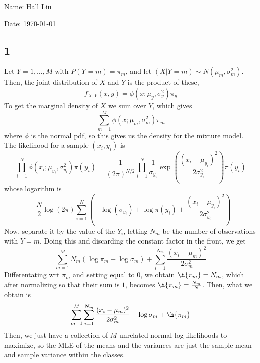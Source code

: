 \documentclass{article}
\begin{document}
Name: Hall Liu

Date: \today 
\vspace{1.5cm}
\subsection*{1}
Let $Y=1,\ldots,M$ with $P(Y=m)=\pi_m$, and let $(X|Y=m)\sim N(\mu_m, \sigma_m^2)$. Then, the joint distribution of $X$ and $Y$ is the product of these,
\[f_{X,Y}(x,y)=\phi(x;\mu_y,\sigma_y^2)\pi_y\]
To get the marginal density of $X$ we sum over $Y$, which gives
\[\sum_{m=1}^M\phi(x;\mu_m,\sigma_m^2)\pi_m\]
where $\phi$ is the normal pdf, so this gives us the density for the mixture model.
The likelihood for a sample $(x_i,y_i)$ is 
\[\prod_{i=1}^N\phi(x_i;\mu_{y_i}, \sigma_{y_i}^2)\pi(y_i)=\frac{1}{(2\pi)^{N/2}}\prod_{i=1}^N\frac{1}{\sigma_{y_i}}\exp\left(\frac{(x_i-\mu_{y_i})^2}{2\sigma_{y_i}^2}\right)\pi(y_i)\]
whose logarithm is 
\[-\frac{N}{2}\log(2\pi)\sum_{i=1}^N\left(-\log(\sigma_{y_i})+\log\pi(y_i)+\frac{(x_i-\mu_{y_i})^2}{2\sigma_{y_i}^2}\right)\]
Now, separate it by the value of the $Y_i$, letting $N_m$ be the number of observations with $Y=m$. Doing this and discarding the constant factor in the front, we get
\[\sum_{m=1}^MN_m\left(\log\pi_m-\log\sigma_m\right)+\sum_{i=1}^{N_m}\frac{(x_i-\mu_m)^2}{2\sigma_m^2}\]
Differentating wrt $\pi_m$ and setting equal to $0$, we obtain $\h{\pi_m}=N_m$, which after normalizing so that their sum is $1$, becomes $\h{\pi_m}=\frac{N_m}{N}$. Then, what we obtain is
\[\sum_{m=1}^M\sum_{i=1}^{N_m}\frac{(x_i-\mu_m)^2}{2\sigma_m^2}-\log\sigma_m+\h{\pi_m}\]
Then, we just have a collection of $M$ unrelated normal log-likelihoods to maximize, so the MLE of the means and the variances are just the sample mean and sample variance within the classes.
\end{document}
